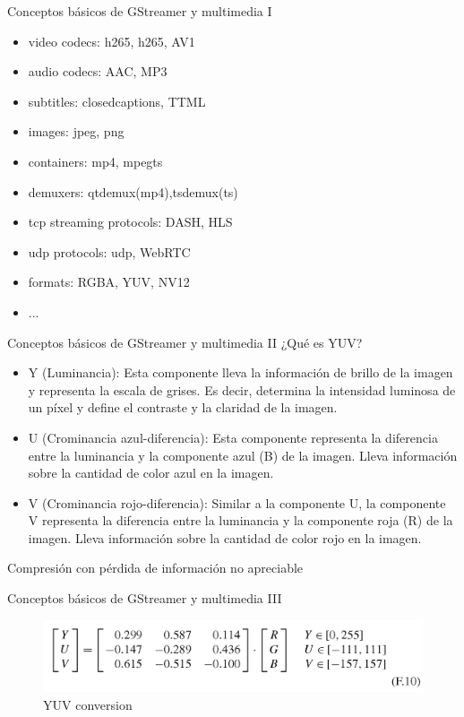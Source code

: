 \documentclass{beamer}
\begin{document}
\begin{frame}{Conceptos básicos de GStreamer y multimedia I}
  \begin{itemize}
    \item video codecs: h265, h265, AV1
    \item audio codecs: AAC, MP3
    \item subtitles: closedcaptions, TTML
    \item images: jpeg, png
    \item containers: mp4, mpegts
    \item demuxers: qtdemux(mp4),tsdemux(ts)
    \item tcp streaming protocols: DASH, HLS
    \item udp protocols: udp, WebRTC
    \item formats: RGBA, YUV, NV12
    \item ...
  \end{itemize}
\end{frame}

\begin{frame}{Conceptos básicos de GStreamer y multimedia II}
  ¿Qué es YUV?
  \begin{itemize}
    \item Y (Luminancia): Esta componente lleva la información de brillo de la imagen y representa la escala de grises. Es decir, determina la intensidad luminosa de un píxel y define el contraste y la claridad de la imagen.
    \item U (Crominancia azul-diferencia): Esta componente representa la diferencia entre la luminancia y la componente azul (B) de la imagen. Lleva información sobre la cantidad de color azul en la imagen.
    \item V (Crominancia rojo-diferencia): Similar a la componente U, la componente V representa la diferencia entre la luminancia y la componente roja (R) de la imagen. Lleva información sobre la cantidad de color rojo en la imagen.
  \end{itemize}
  Compresión con pérdida de información no apreciable
\end{frame}

\begin{frame}{Conceptos básicos de GStreamer y multimedia III}
  \begin{figure}
    \includegraphics[width=1\textwidth]{rgba-to-yuv.png}
    \caption{YUV conversion}
  \end{figure}
\end{frame}
\end{document}
